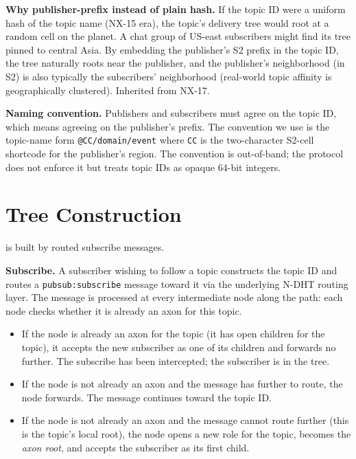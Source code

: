 \documentclass[twoside,nobib]{tufte-book}
\newcommand{\NDHT}{N-DHT\xspace}
\begin{document}
\textbf{Why publisher-prefix instead of plain hash.} If the topic
ID were a uniform hash of the topic name (NX-15 era), the topic's
delivery tree would root at a random cell on the planet. A chat
group of US-east subscribers might find its tree pinned to
central Asia. By embedding the publisher's S2 prefix in the
topic ID, the tree naturally roots near the publisher, and the
publisher's neighborhood (in S2) is also typically the
subscribers' neighborhood (real-world topic affinity is
geographically clustered). Inherited from NX-17.

\textbf{Naming convention.} Publishers and subscribers must agree
on the topic ID, which means agreeing on the publisher's prefix.
The convention we use is the topic-name form
\texttt{@CC/domain/event} where \texttt{CC} is the two-character
S2-cell shortcode for the publisher's region. The convention is
out-of-band; the protocol does not enforce it but treats topic
IDs as opaque 64-bit integers.

\section{Tree Construction}

 is built by routed subscribe
messages.

\textbf{Subscribe.} A subscriber wishing to follow a topic
constructs the topic ID and routes a \texttt{pubsub:subscribe}
message toward it via the underlying \NDHT routing layer. The
message is processed at every intermediate node along the path:
each node checks whether it is already an axon for this topic.

\begin{itemize}\setlength\itemsep{0.15em}
  \item If the node is already an axon for the topic (it has
    open children for the topic), it accepts the new subscriber
    as one of its children and forwards no further. The subscribe
    has been intercepted; the subscriber is in the tree.
  \item If the node is not already an axon and the message has
    further to route, the node forwards. The message continues
    toward the topic ID.
  \item If the node is not already an axon and the message
    cannot route further (this is the topic's local root), the
    node opens a new role for the topic, becomes the
    \emph{axon root}, and accepts the subscriber as its first
    child.
\end{itemize}
\end{document}
